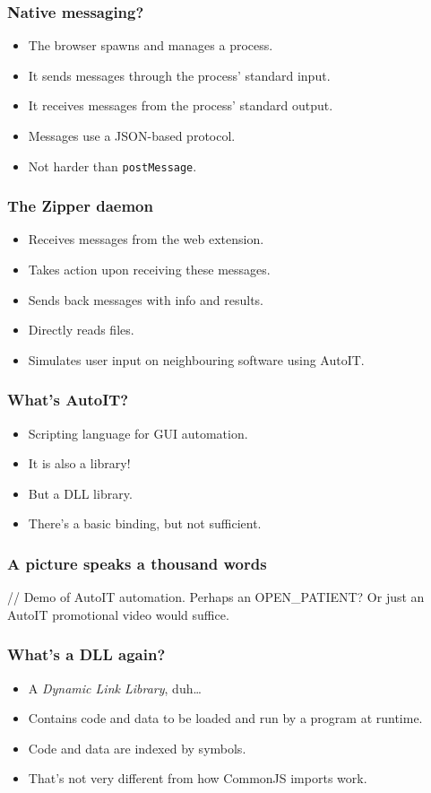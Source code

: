 \begin{frame}
	\frametitle{Native messaging?}

	\begin{itemize}
		\item The browser spawns and manages a process.
		\item It sends messages through the process’ standard input.
		\item It receives messages from the process’ standard output.
		\item Messages use a JSON-based protocol.
		\item Not harder than \texttt{postMessage}.
	\end{itemize}
\end{frame}

\begin{frame}
	\frametitle{The Zipper daemon}

	\begin{itemize}
		\item Receives messages from the web extension.
		\item Takes action upon receiving these messages.
		\item Sends back messages with info and results.
		\item Directly reads files.
		\item Simulates user input on neighbouring software using AutoIT.
	\end{itemize}
\end{frame}

\begin{frame}
	\frametitle{What’s AutoIT?}

	\begin{itemize}
		\item Scripting language for GUI automation.
		\item It is also a library!
		\item But a DLL library.
		\item There’s a basic binding, but not sufficient.
	\end{itemize}
\end{frame}

\begin{frame}
	\frametitle{A picture speaks a thousand words}

	// Demo of AutoIT automation. Perhaps an OPEN\_PATIENT? Or just an AutoIT
	promotional video would suffice.
\end{frame}

\begin{frame}
	\frametitle{What’s a DLL again?}

	\begin{itemize}
		\item A {\em Dynamic Link Library}, duh…
		\item Contains code and data to be loaded and run by a program at runtime.
		\item Code and data are indexed by symbols.
		\item That’s not very different from how CommonJS imports work.
	\end{itemize}
\end{frame}

